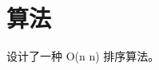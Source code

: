 \documentclass{ctexart}
\begin{document}
\section{算法}
设计了一种 O(n \log n) 排序算法。\cite{kohnen2019}
\end{document}
